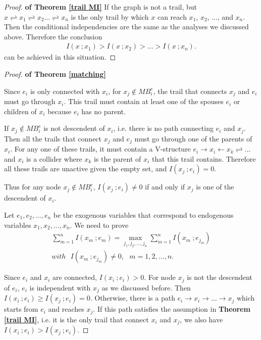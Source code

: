 \documentclass[twoside,11pt]{article}
\begin{document}
\begin{proof}{\textbf{of Theorem \ref{trail MI}}}
If the graph is not a trail, but $x\rightleftharpoons x_1 \rightleftharpoons x_2 ... \rightleftharpoons x_n$ is the only trail by which $x$ can reach $x_1$, $x_2$, ..., and $x_n$. Then the conditional independencies are the same as the analyses we discussed above. Therefore the conclusion
\begin{align*}
I(x\ ;x_1)>I(x\ ;x_2)>...>I(x\ ;x_n).
\end{align*}
can be achieved in this situation.

\end{proof}










\begin{proof}{\textbf{of Theorem \ref{matching}}}

Since $e_i$ is only connected with $x_i$, for $x_j\notin MB^e_i$, the trail that connects $x_j$ and $e_i$ must go through $x_i$. This trail must contain at least one of the spouses $e_i$ or children of $x_i$ because $e_i$ has no parent. 

If $x_j\notin MB^e_i$ is not descendent of $x_i$, i.e. there is no path connecting $e_i$ and $x_j$. Then all the trails that connect $x_j$ and $e_j$ must go through one of the parents of $x_i$. For any one of these trails, it must contain a V-structure $e_i\to x_i \gets x_k\rightleftharpoons...$ and $x_i$ is a collider where $x_k$ is the parent of $x_i$ that this trail contains. Therefore all these trails are unactive given the empty set, and $I(x_j\ ; e_i)=0$.

Thus for any node $x_j\notin MB^e_i$, $I(x_j\ ;e_i)\neq 0$ if and only if $x_j$ is one of the descendent of $x_i$.

Let $e_1, e_2, ..., e_n$ be the exogenous variables that correspond to endogenous variables $x_1, x_2, ..., x_n$. We need to prove 
\begin{align}\label{1}
\sum^n_{m=1} I(x_m\ ;e_m)=\max_{j_1, j_2, ..., j_n}\sum^n_{m=1}I(x_m\ ;e_{j_m})\\
with\ \ \ I(x_m\ ;e_{j_m})\neq 0,\ \ \ m=1,2,..., n .\label{2}
\end{align}

Since $e_i$ and $x_i$ are connected, $I(x_i\ ;e_i)>0$. For node $x_j$ is not the descendent of $e_i$, $e_i$ is independent with $x_j$ as we discussed before. Then $I(x_i\ ;e_i)\geq I(x_j\ ;e_i)=0$. Otherwise, there is a path $e_i\to x_i\to ... \to x_j$ which starts from $e_i$ and reaches $x_j$. If this path satisfies the assumption in \textbf{Theorem \ref{trail MI}}, i.e. it is the only trail that connect $x_i$ and $x_j$, we also have $I(x_i\ ;e_i)>I(x_j\ ;e_i)$. 


\end{proof}
\end{document}
